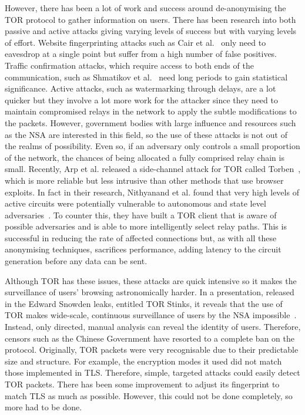 \documentclass[ %
                    author={Samuel Russell},
                supervisor={Prof. Bogdan Warinschi},
                    degree={MEng},
                     title={Innocuous Ciphertexts},
                  subtitle={The DE-CENSOR Scheme},
                      type={Research},
                      year={2018} ]{dissertation}
\begin{document}
However, there has been a lot of work and success around de-anonymising the TOR protocol to gather information on users. There has been research into both passive and active attacks giving varying levels of success but with varying levels of effort. Website fingerprinting attacks such as Cair et al.~\cite{webfinger} only need to eavesdrop at a single point but suffer from a high number of false positives. Traffic confirmation attacks, which require access to both ends of the communication, such as Shmatikov et al.~\cite{conf} need long periods to gain statistical significance. Active attacks, such as watermarking through delays, are a lot quicker but they involve a lot more work for the attacker since they need to maintain compromised relays in the network to apply the subtle modifications to the packets. However, government bodies with large influence and resources such as the NSA are interested in this field, so the use of these attacks is not out of the realms of possibility. Even so, if an adversary only controls a small proportion of the network, the chances of being allocated a fully comprised relay chain is small. Recently, Arp et al. released a side-channel attack for TOR called Torben~\cite{torben}, which is more reliable but less intrusive than other methods that use browser exploits. In fact in their research, Nithyanand et al. found that very high levels of active circuits were potentially vulnerable to autonomous and state level adversaries~\cite{AS}. To counter this, they have built a TOR client that is aware of possible adversaries and is able to more intelligently select relay paths. This is successful in reducing the rate of affected connections but, as with all these anonymising techniques, sacrifices performance, adding latency to the circuit generation before any data can be sent.

Although TOR has these issues, these attacks are quick intensive so it makes the surveillance of users' browsing astronomically harder.
In a presentation, released in the Edward Snowden leaks, entitled TOR Stinks, it reveals that the use of TOR makes wide-scale, continuous surveillance of users by the NSA impossible~\cite{tor_stinks}.
Instead, only directed, manual analysis can reveal the identity of users.
Therefore, censors such as the Chinese Government have resorted to a complete ban on the protocol.
Originally, TOR packets were very recognisable due to their predictable size and structure.
For example, the encryption modes it used did not match those implemented in TLS.
Therefore, simple, targeted attacks could easily detect TOR packets.
There has been some improvement to adjust its fingerprint to match TLS as much as possible. However, this could not be done completely, so more had to be done.
\end{document}
